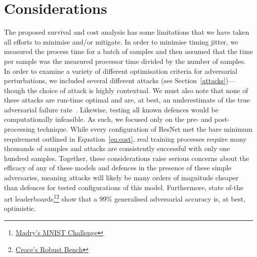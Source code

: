 \section{Considerations}
The proposed survival and cost analysis  has some limitations that we have taken all efforts to minimise and/or mitigate. 
In order to minimise timing jitter, we measured the process time for a batch of samples and then assumed that the time per sample was the measured processor time divided by the number of samples. 
In order to examine a variety of different optimisation criteria for adversarial perturbations, we included several different attacks (see Section~\ref{attacks})---though the choice of attack is highly contextual.
We must also note that none of these attacks are run-time optimal and are, at best, an underestimate of the true adversarial failure rate~\cite{meyers}. 
Likewise, testing all known defences would be computationally infeasible. 
As such, we focused only on the pre- and post-processing technique. 
While every configuration of ResNet met the bare minimum requirement outlined in Equation~\ref{eq:cost}, real training processes require many thousands of samples and attacks are consistently successful with only one hundred samples. 
Together, these considerations raise serious concerns about the efficacy of any of these models and defences in the presence of these simple adversaries, meaning attacks will likely be many orders of magnitude cheaper than defences for tested configurations of this model.
Furthermore, state of-the art leaderboards\footnote{\href{https://github.com/MadryLab/mnist\_challenge}{Madry's MNIST Challenge}}\footnote{\href{https://ml.cs.tsinghua.edu.cn/adv\-bench/}{Croce's Robust Bench}}
show that a 99\% generalised adversarial accuracy is, at best, optimistic. 

